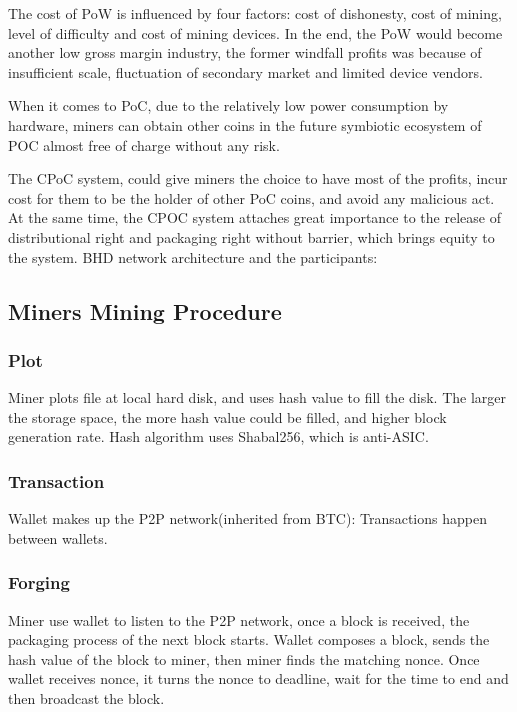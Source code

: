\begin{flushleft}
    The cost of PoW is influenced by four factors: cost of dishonesty, cost of mining, level of difficulty and cost of mining devices. In the end, the PoW would become another low gross margin industry, the former windfall profits was because of insufficient scale, fluctuation of secondary market and limited device vendors.
\end{flushleft}
\begin{flushleft}
    When it comes to PoC, due to the relatively low power consumption by hardware, miners can obtain other coins in the future symbiotic ecosystem of POC almost free of charge without any risk.
\end{flushleft}
\begin{flushleft}
    The CPoC system, could give miners the choice to have most of the profits, incur cost for them to be the holder of other PoC coins, and avoid any malicious act. At the same time, the CPOC system attaches great importance to the release of distributional right and packaging right without barrier, which brings equity to the system. BHD network architecture and the participants:
\end{flushleft}
\subsection{Miners Mining Procedure}
\subsubsection{Plot}
\begin{flushleft}
    Miner plots file at local hard disk, and uses hash value to fill the disk. The larger the storage space, the more hash value could be filled, and higher block generation rate. Hash algorithm uses Shabal256, which is anti-ASIC.
\end{flushleft}
\subsubsection{Transaction}
\begin{flushleft}
    Wallet makes up the P2P network(inherited from BTC): Transactions happen between wallets.
\end{flushleft}
\subsubsection{Forging}
\begin{flushleft}
    Miner use wallet to listen to the P2P network, once a block is received, the packaging process of the next block starts. Wallet composes a block, sends the hash value of the block to miner, then miner finds the matching nonce. Once wallet receives nonce, it turns the nonce to deadline, wait for the time to end and then broadcast the block.
\end{flushleft}
